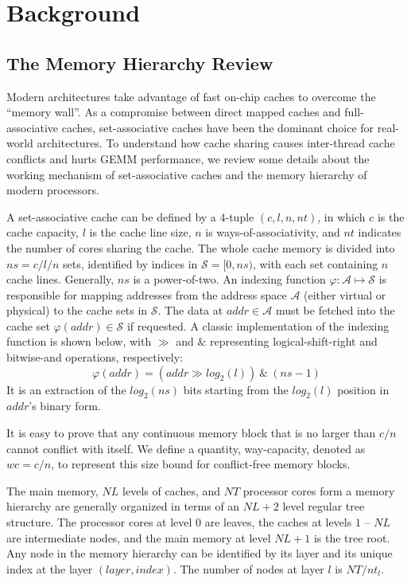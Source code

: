 \section{Background}\label{sec:background}

\subsection{The Memory Hierarchy Review}\label{subsec:hierarchy}

Modern architectures take advantage of fast on-chip caches
to overcome the ``memory wall''.
As a compromise between direct mapped caches
and full-associative caches,
set-associative caches have been the dominant choice for real-world architectures.
To understand how cache sharing causes
inter-thread cache conflicts
and hurts GEMM performance, we review some details
about the working mechanism of set-associative caches and
the memory hierarchy of modern processors.

A set-associative cache can be defined by a 4-tuple $(c, l, n, nt)$,
in which $c$ is the cache capacity, $l$ is the cache line size,
$n$ is ways-of-associativity,
and $nt$ indicates the number of cores sharing the cache.
The whole cache memory is divided into $ns=c/l/n$ sets,
identified by indices in $\mathcal{S} = [0, ns)$,
with each set containing $n$ cache lines.
Generally, $ns$ is a power-of-two.
An indexing function $\varphi: \mathcal{A} \mapsto \mathcal{S}$ is responsible for
mapping addresses from the address space $\mathcal{A}$
(either virtual or physical) to the cache sets in
$\mathcal{S}$.
The data at $addr \in \mathcal{A}$ must be fetched
into the cache set $\varphi(addr) \in \mathcal{S}$ if requested.
A classic implementation of the indexing function is shown below,
with $\gg$ and $\&$ representing logical-shift-right and bitwise-and operations, respectively:
\begin{equation*}
  \varphi(addr) = (addr \gg log_2(l)) ~\&~ (ns-1)
  \label{eq:phi}
\end{equation*}
It is an extraction of the $log_2(ns)$ bits starting from the $log_2(l)$
position in $addr$'s binary form.

It is easy to prove that any continuous memory block
that is no larger than $c/n$
cannot conflict with itself.
We define a quantity, way-capacity, denoted as $wc=c/n$,
to represent this size bound for conflict-free memory blocks.

The main memory, $NL$ levels of caches, and $NT$ processor cores
form a memory hierarchy are generally organized in terms
of an $NL+2$ level regular tree structure.
The processor cores at level $0$ are leaves,
the caches at levels $1$ -- $NL$ are intermediate nodes,
and the main memory at level $NL+1$ is the tree root.
Any node in the memory hierarchy can be identified by
its layer and its unique index at the layer $(layer, index)$.
The number of nodes at layer $l$ is $NT / nt_l$.


